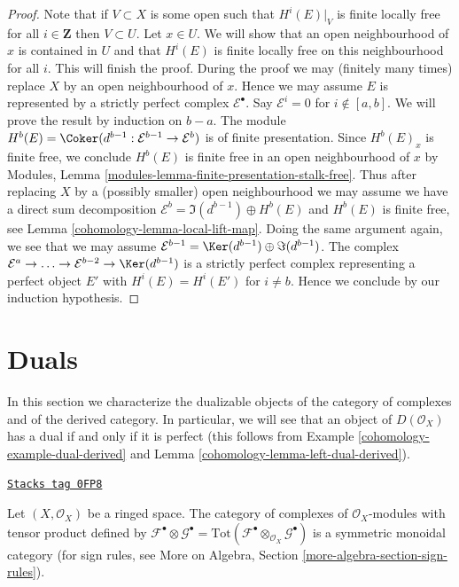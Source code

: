 \begin{proof}

Note that if $V \subset X$ is some open such that $H^i(E)|_V$
is finite locally free for all $i \in \mathbf{Z}$ then $V \subset U$.
Let $x \in U$. We will show that an open neighbourhood of $x$
is contained in $U$ and that $H^i(E)$ is finite locally free
on this neighbourhood for all $i$. This will finish the proof.
During the proof we may (finitely many times) replace
$X$ by an open neighbourhood of $x$.
Hence we may assume $E$ is represented
by a strictly perfect complex $\mathcal{E}^\bullet$. Say
$\mathcal{E}^i = 0$ for $i \not \in [a, b]$. We will
prove the result by induction on $b - a$. The module
$H^b(E) = \Coker(d^{b - 1} : \mathcal{E}^{b - 1} \to \mathcal{E}^b)$
is of finite presentation. Since $H^b(E)_x$ is finite free,
we conclude $H^b(E)$ is finite free in an open neighbourhood of $x$ by
Modules, Lemma \ref{modules-lemma-finite-presentation-stalk-free}.
Thus after replacing $X$ by a (possibly smaller) open
neighbourhood we may assume we have a direct sum decomposition
$\mathcal{E}^b = \Im(d^{b - 1}) \oplus H^b(E)$ and
$H^b(E)$ is finite free, see Lemma \ref{cohomology-lemma-local-lift-map}.
Doing the same argument again, we see that we may
assume $\mathcal{E}^{b - 1} = \Ker(d^{b - 1}) \oplus \Im(d^{b - 1})$.
The complex
$\mathcal{E}^a \to \ldots \to \mathcal{E}^{b - 2} \to \Ker(d^{b - 1})$
is a strictly perfect complex representing a perfect
object $E'$ with $H^i(E) = H^i(E')$ for $i \not = b$.
Hence we conclude by our induction hypothesis.
\end{proof}

\section{Duals}
\label{cohomology-section-duals}
In this section we characterize the dualizable objects of
the category of complexes and of the derived category.
In particular, we will see that an object of $D(\mathcal{O}_X)$
has a dual if and only if it is perfect (this follows from
Example \ref{cohomology-example-dual-derived} and
Lemma \ref{cohomology-lemma-left-dual-derived}).

\begin{lemma}
\label{cohomology-lemma-symmetric-monoidal-cat-complexes}
\href{https://stacks.math.columbia.edu/tag/0FP8}{\texttt{Stacks tag 0FP8}}

Let $(X, \mathcal{O}_X)$ be a ringed space. The category of complexes
of $\mathcal{O}_X$-modules with tensor product defined by
$\mathcal{F}^\bullet \otimes \mathcal{G}^\bullet =
\text{Tot}(\mathcal{F}^\bullet \otimes_{\mathcal{O}_X} \mathcal{G}^\bullet)$
is a symmetric monoidal category (for sign rules, see
More on Algebra, Section \ref{more-algebra-section-sign-rules}).
\end{lemma}

